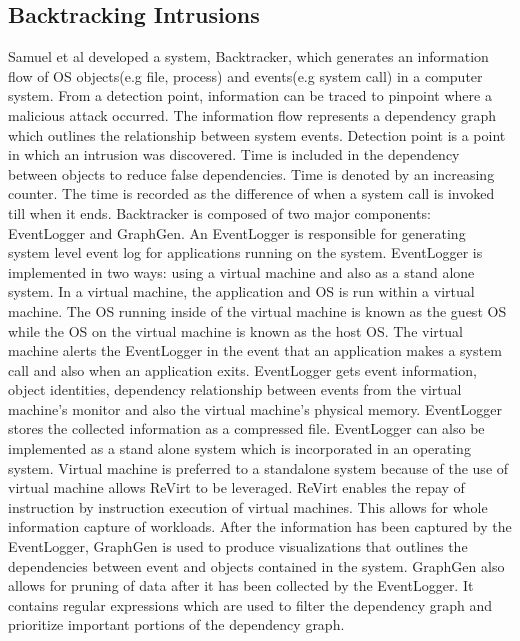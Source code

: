 \subsection{Backtracking Intrusions}
Samuel et al \cite{King:2003:BI:945445.945467} developed a system, Backtracker, which generates an information flow of OS objects(e.g file, process) and events(e.g system call) in a computer system. From a detection point, information can be traced to pinpoint where a malicious attack occurred. The information flow represents a dependency graph which outlines the relationship between system events. Detection point is a point in which an intrusion was discovered. Time is included in the dependency between objects to reduce false dependencies. Time is denoted by an increasing counter. The time is recorded as the difference of when a system call is invoked till when it ends. Backtracker is composed of two major components: EventLogger and GraphGen. An EventLogger is responsible for generating system level event log for applications running on the system. EventLogger is implemented in two ways: using a virtual machine and also as a stand alone system. In a virtual machine, the application and OS is run within a virtual machine. The OS running inside of the virtual machine is known as the guest OS while the OS on the virtual machine is known as the host OS. The virtual machine alerts the EventLogger in the event that an application makes a system call and also when an application exits. EventLogger gets event information, object identities, dependency relationship between events from the virtual machine's monitor and also the virtual machine's physical memory. EventLogger stores the collected information as a compressed file. EventLogger can also be implemented as a stand alone system which is incorporated in an operating system. Virtual machine is preferred to a standalone system because of the use of virtual machine allows ReVirt to be leveraged. ReVirt enables the repay of instruction by instruction execution of virtual machines. This allows for whole information capture of workloads. After the information has been captured by the EventLogger, GraphGen is used to produce visualizations that outlines the dependencies between event and objects contained in the system. GraphGen also allows for pruning of data after it has been collected by the EventLogger. It contains regular expressions which are used to filter the dependency graph and prioritize important portions of the dependency graph.



